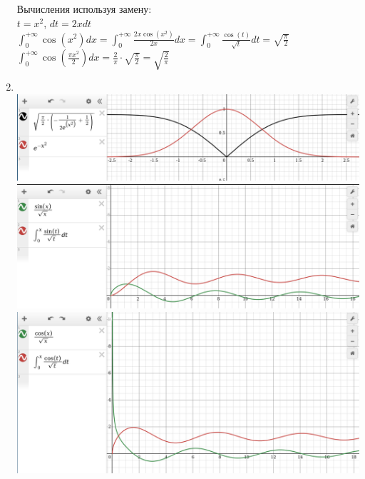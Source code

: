 \begin{enumerate}
        Вычисления используя замену:\\
        $t = x^2$, $dt = 2xdt$ \\
        $\int_0^{+\infty} \cos(x^2) dx = \int_0^{+\infty} \frac{2x\cos(x^2)}{2x} dx = \int_0^{+\infty} \frac{\cos(t)}{\sqrt{t}} dt = \sqrt{\frac{\pi}{2}}$ \\
        $\int_0^{+\infty} \cos(\frac{\pi x^2}{2}) dx = \frac{2}{\pi} \cdot \sqrt{\frac{\pi}{2}} = \sqrt{\frac{2}{\pi}}$ \\
    \item \ \\
        \includegraphics[scale=0.3]{images/3a}\\
        \includegraphics[scale=0.3]{images/3b}\\
        \includegraphics[scale=0.3]{images/3c}\\

\end{enumerate}
\clearpage
